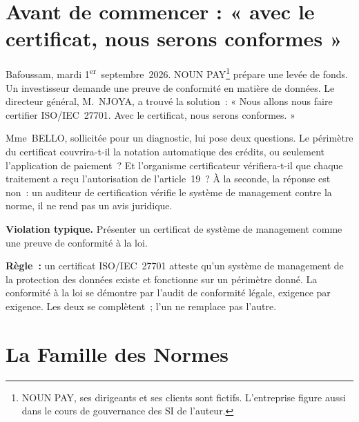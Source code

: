\section*{Avant de commencer : « avec le certificat, nous serons conformes »}

Bafoussam, mardi 1\textsuperscript{er}~septembre~2026. NOUN PAY\footnote{NOUN
PAY, ses dirigeants et ses clients sont fictifs. L'entreprise figure aussi
dans le cours de gouvernance des SI de l'auteur.} prépare une levée de fonds.
Un investisseur demande une preuve de conformité en matière de données. Le
directeur général, M.~NJOYA, a trouvé la solution~: « Nous allons nous faire
certifier ISO/IEC~27701. Avec le certificat, nous serons conformes. »

Mme~BELLO, sollicitée pour un diagnostic, lui pose deux questions. Le
périmètre du certificat couvrira-t-il la notation automatique des
crédits, ou seulement l'application de paiement~? Et l'organisme
certificateur vérifiera-t-il que chaque traitement a reçu l'autorisation de
l'article~19~? À la seconde, la réponse est non~: un auditeur de
certification vérifie le système de management contre la norme, il ne
rend pas un avis juridique.

\begin{boxalert}
\textbf{Violation typique.} Présenter un certificat de système de
management comme une preuve de conformité à la loi.

\smallskip
\textbf{Règle~:} un certificat ISO/IEC~27701 atteste qu'un système de
management de la protection des données existe et fonctionne sur un
périmètre donné. La conformité à la loi se démontre par l'audit de
conformité légale, exigence par exigence. Les deux se complètent~; l'un ne
remplace pas l'autre.
\end{boxalert}

\section{La Famille des Normes}
\label{sec:c09-famille}

